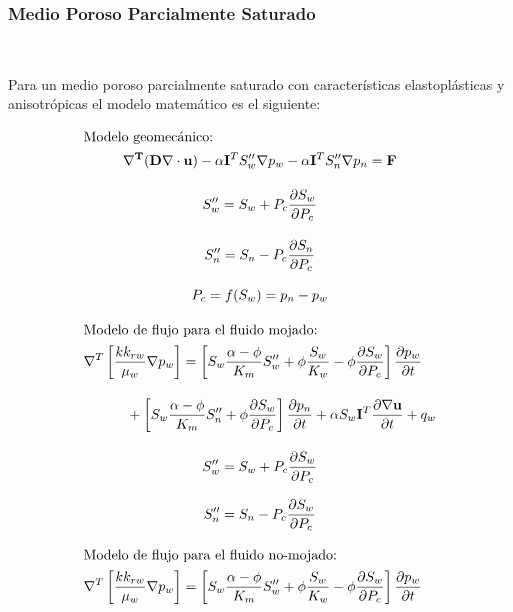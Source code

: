 \subsubsection{Medio Poroso Parcialmente Saturado}~\hypertarget{sec:sec3412}{}
\label{sec:sec3412}

Para un medio poroso parcialmente saturado con características elastoplásticas y anisotrópicas el modelo matemático es el siguiente:

\begin{ceqn} 
\begin{subequations} \label{eq:equ358} 
\begin{gather}
\shortintertext{Modelo geomecánico:} \mathbf{\nabla^T}(\mathbf{D}\mathbf{\nabla}\cdot\mathbf{u})-\alpha\mathbf{I}^TS''_w\mathbf{\nabla}p_w -\alpha\mathbf{I}^TS''_n\mathbf{\nabla}p_n=\mathbf{F} \label{eq:equ358a} \\[10pt]
S''_w = S_w + P_c\frac{\partial S_w}{\partial P_c}  \label{eq:equ358b} \\[10pt]
S''_n = S_n - P_c\frac{\partial S_n}{\partial P_c}  \label{eq:equ358c} \\[8pt]
P_c = \mathnormal{f}(S_w) = p_n - p_w  \label{eq:equ358d} \\[8pt]
\shortintertext{Modelo de flujo para el fluido mojado:} 	
\begin{multlined}
\nabla^T \left[\frac{k k_{rw}}{\mu_{w}}\nabla p_w\right] = \left[S_w \frac{\alpha - \phi}{K_m}S''_w + \phi\frac{S_w}{K_w} - \phi\frac{\partial S_w}{\partial P_c}\right]\frac{\partial p_w}{\partial t} \\[10pt]
+ \left[S_w \frac{\alpha - \phi}{K_m}S''_n + \phi\frac{\partial S_w}{\partial P_c}\right]\frac{\partial p_n}{\partial t} +\alpha S_w\mathbf{I}^T\frac{\partial \nabla \mathbf{u}}{\partial t} + q_w\end{multlined} \label{eq:equ358e}\\[10pt]
S''_w = S_w + P_c\frac{\partial S_w}{\partial P_c}  \label{eq:equ358f}\\[8pt]
S''_n = S_n - P_c\frac{\partial S_w}{\partial P_c}  \label{eq:equ358g}\\[8pt]
\shortintertext{Modelo de flujo para el fluido no-mojado:} 	
\begin{multlined}
\nabla^T \left[\frac{k k_{rw}}{\mu_{w}}\nabla p_w\right] = \left[S_w \frac{\alpha - \phi}{K_m}S''_w + \phi\frac{S_w}{K_w} - \phi\frac{\partial S_w}{\partial P_c}\right]\frac{\partial p_w}{\partial t} \\[10pt]

\end{multlined}
\end{gather}
\end{subequations}
\end{ceqn}
